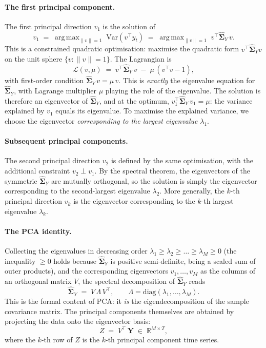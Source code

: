 \documentclass[11pt, a4paper, oneside]{article}
\DeclareMathOperator*{\argmax}{arg\,max}
\newcommand{\mY}{\mathbf{Y}}
\begin{document}
\paragraph{The first principal component.}
The first principal direction $v_1$ is the solution of
\begin{equation}
v_1 \;=\; \argmax_{\|v\| = 1}\; \mathrm{Var}(v^{\top} y_t) \;=\; \argmax_{\|v\| = 1}\; v^{\top} \widehat{\boldsymbol{\Sigma}}_Y\, v.
\label{eq:pca-first-direction}
\end{equation}
This is a constrained quadratic optimisation: maximise the quadratic
form $v^{\top} \widehat{\boldsymbol{\Sigma}}_Y v$ on the unit sphere
$\{v : \|v\| = 1\}$. The Lagrangian is
\[
\mathcal{L}(v, \mu) \;=\; v^{\top} \widehat{\boldsymbol{\Sigma}}_Y\, v \;-\; \mu\,(v^{\top} v - 1),
\]
with first-order condition
$\widehat{\boldsymbol{\Sigma}}_Y\, v = \mu\, v$. This is \emph{exactly}
the eigenvalue equation for $\widehat{\boldsymbol{\Sigma}}_Y$, with
Lagrange multiplier $\mu$ playing the role of the eigenvalue. The
solution is therefore an eigenvector of $\widehat{\boldsymbol{\Sigma}}_Y$,
and at the optimum,
$v_1^{\top} \widehat{\boldsymbol{\Sigma}}_Y\, v_1 = \mu$: the variance
explained by $v_1$ equals its eigenvalue. To maximise the explained
variance, we choose the eigenvector \emph{corresponding to the
largest eigenvalue} $\lambda_1$.

\paragraph{Subsequent principal components.}
The second principal direction $v_2$ is defined by the same
optimisation, with the additional constraint $v_2 \perp v_1$. By the
spectral theorem, the eigenvectors of the symmetric
$\widehat{\boldsymbol{\Sigma}}_Y$ are mutually orthogonal, so the
solution is simply the eigenvector corresponding to the second-largest
eigenvalue $\lambda_2$. More generally, the $k$-th principal direction
$v_k$ is the eigenvector corresponding to the $k$-th largest
eigenvalue $\lambda_k$.

\paragraph{The PCA identity.}
Collecting the eigenvalues in decreasing order
$\lambda_1 \geq \lambda_2 \geq \ldots \geq \lambda_M \geq 0$ (the
inequality $\geq 0$ holds because
$\widehat{\boldsymbol{\Sigma}}_Y$ is positive semi-definite, being a
scaled sum of outer products), and the corresponding eigenvectors
$v_1, \ldots, v_M$ as the columns of an orthogonal matrix $V$, the
spectral decomposition of $\widehat{\boldsymbol{\Sigma}}_Y$ reads
\[
\widehat{\boldsymbol{\Sigma}}_Y \;=\; V\, \Lambda\, V^{\top}, \qquad \Lambda = \mathrm{diag}(\lambda_1, \ldots, \lambda_M).
\]
This is the formal content of PCA: it \emph{is} the eigendecomposition
of the sample covariance matrix. The principal components themselves
are obtained by projecting the data onto the eigenvector basis:
\[
Z \;=\; V^{\top}\, \mY \;\in\; \mathbb{R}^{M \times T},
\]
where the $k$-th row of $Z$ is the $k$-th principal component time
series.
\end{document}
